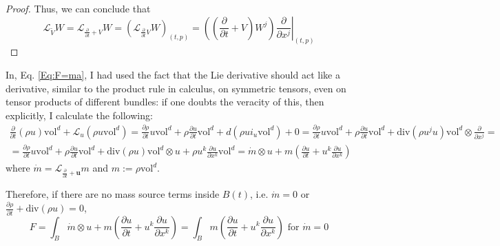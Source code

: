\documentclass[twoside,landscape,10pt]{amsart}
\theoremstyle{plain}
\theoremstyle{definition}
\theoremstyle{remark}
\theoremstyle{remark}
\begin{document}
\begin{multicols*}{2}
\begin{proof}
Thus, we can conclude that 
\begin{equation}
  \boxed{ \mathcal{L}_{\widetilde{V}}W = \mathcal{L}_{ \frac{ \partial }{ \partial t} +V}W = \left( \mathcal{L}_{ \frac{ \partial}{ \partial t} V } W \right)_{(t,p)} = \left( \left( \frac{ \partial }{ \partial t} + V \right) W^j \right) \left. \frac{ \partial }{ \partial x^j} \right|_{(t,p)} }
\end{equation}
 

\end{proof}

In, Eq. \ref{Eq:F=ma}, I had used the fact that the Lie derivative should act like a derivative, similar to the product rule in calculus, on symmetric tensors, even on tensor products of different bundles: if one doubts the veracity of this, then explicitly, I calculate the following:
\[
\begin{gathered}
  \frac{ \partial }{ \partial t}(\rho u) \text{vol}^d + \mathcal{L}_u (\rho u\text{vol}^d) = \frac{ \partial \rho }{ \partial t} u \text{vol}^d + \rho \frac{ \partial u }{ \partial t} \text{vol}^d + d(\rho u i_u\text{vol}^d) + 0 = \frac{ \partial \rho }{ \partial t} u \text{vol}^d + \rho \frac{ \partial u}{ \partial t} \text{vol}^d + \text{div}(\rho u^j u) \text{vol}^d \otimes \frac{ \partial }{ \partial x^j} = \\
  = \frac{ \partial \rho }{ \partial t} u \text{vol}^d + \rho \frac{ \partial u }{ \partial t} \text{vol}^d + \text{div}(\rho u) \text{vol}^d \otimes u + \rho u^k \frac{ \partial u}{ \partial x^k} \text{vol}^d = \dot{m} \otimes u + m \left( \frac{ \partial u }{ \partial t} + u^k \frac{ \partial u }{ \partial x^k } \right)
\end{gathered}
\]
where $\dot{m} = \mathcal{L}_{\frac{ \partial }{ \partial t} + \mathbf{u}} m$ and $m := \rho \text{vol}^d$.  


Therefore, if there are no mass source terms inside $B(t)$, i.e. $\dot{m} =0 $ or $\frac{ \partial \rho}{ \partial t} + \text{div}(\rho u) = 0$, 
\begin{equation}\label{Eq:F=mafromLiederivative}
  \boxed{
    F = \int_B \dot{m} \otimes u + m \left( \frac{ \partial u}{ \partial t} + u^k \frac{ \partial u}{ \partial x^k} \right) = \int_B m \left( \frac{ \partial u}{ \partial t} + u^k \frac{ \partial u}{ \partial x^k} \right) 
} \text{ for } \dot{m}=0
\end{equation}




\end{multicols*}
\end{document}
